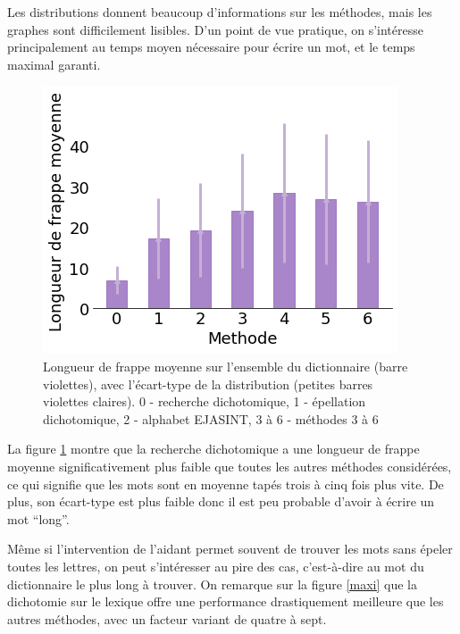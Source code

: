 \documentclass[twoside,twocolumn]{article}
\begin{document}
Les distributions donnent beaucoup d'informations sur les méthodes, mais les graphes sont difficilement lisibles. D'un point de vue pratique, on s'intéresse principalement au temps moyen nécessaire pour écrire un mot, et le temps maximal garanti.
\begin{center}
\begin{figure}
  \includegraphics[scale=0.5]{mean.png}
  \caption{Longueur de frappe moyenne sur l'ensemble du dictionnaire (barre violettes), avec l'écart-type de la distribution (petites barres violettes claires). 0 - recherche dichotomique, 1 - épellation dichotomique, 2 - alphabet EJASINT, 3 à 6 - méthodes 3 à 6}
  \label{mean}
\end{figure}
\end{center}
La figure \ref{mean} montre que la recherche dichotomique a une longueur de frappe moyenne significativement plus faible que toutes les autres méthodes considérées, ce qui signifie que les mots sont en moyenne tapés trois à cinq fois plus vite. De plus, son écart-type est plus faible donc il est peu probable d'avoir à écrire un mot ``long''.



Même si l'intervention de l'aidant permet souvent de trouver les mots sans épeler toutes les lettres, on peut s'intéresser au pire des cas, c'est-à-dire au mot du dictionnaire le plus long à trouver. On remarque sur la figure \ref{maxi} que la dichotomie sur le lexique offre une performance drastiquement meilleure que les autres méthodes, avec un facteur variant de quatre à sept.
\end{document}
